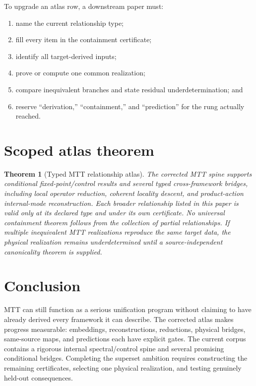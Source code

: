 \documentclass[11pt]{article}
\newtheorem{theorem}{Theorem}[section]
\begin{document}
To upgrade an atlas row, a downstream paper must:
\begin{enumerate}
\item name the current relationship type;
\item fill every item in the containment certificate;
\item identify all target-derived inputs;
\item prove or compute one common realization;
\item compare inequivalent branches and state residual underdetermination; and
\item reserve ``derivation,'' ``containment,'' and ``prediction'' for the rung
actually reached.
\end{enumerate}

\section{Scoped atlas theorem}

\begin{theorem}[Typed MTT relationship atlas]\label{thm:atlas}
The corrected MTT spine supports conditional fixed-point/control results and
several typed cross-framework bridges, including local operator reduction,
coherent locality descent, and product-action internal-mode reconstruction.
Each broader relationship listed in this paper is valid only at its declared
type and under its own certificate. No universal containment theorem follows
from the collection of partial relationships. If multiple inequivalent MTT
realizations reproduce the same target data, the physical realization remains
underdetermined until a source-independent canonicality theorem is supplied.
\end{theorem}

\section{Conclusion}

MTT can still function as a serious unification program without claiming to
have already derived every framework it can describe. The corrected atlas
makes progress measurable: embeddings, reconstructions, reductions, physical
bridges, same-source maps, and predictions each have explicit gates. The
current corpus contains a rigorous internal spectral/control spine and several
promising conditional bridges. Completing the superset ambition requires
constructing the remaining certificates, selecting one physical realization,
and testing genuinely held-out consequences.
\end{document}
